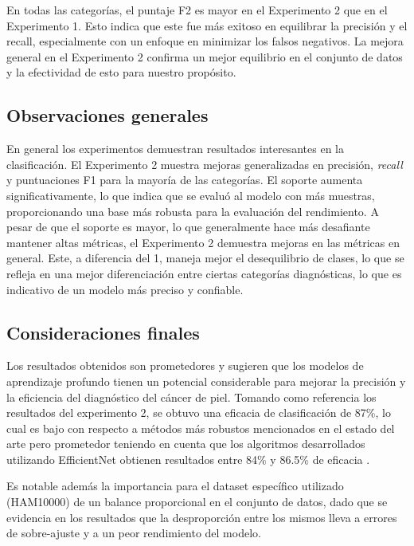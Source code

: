 En todas las categorías, el puntaje F2 es mayor en el Experimento 2 que en el Experimento 1. Esto indica que este fue más exitoso en equilibrar la precisión y el recall, especialmente con un enfoque en minimizar los falsos negativos. La mejora general en el Experimento 2 confirma un mejor equilibrio en el conjunto de datos y la efectividad de esto para nuestro propósito.

\subsection{Observaciones generales}

En general los experimentos demuestran resultados interesantes en la clasificación. El Experimento 2 muestra mejoras generalizadas en precisión, \textit{recall} y puntuaciones F1 para la mayoría de las categorías. El soporte aumenta significativamente, lo que indica que se evaluó al modelo con más muestras, proporcionando una base más robusta para la evaluación del rendimiento. A pesar de que el soporte es mayor, lo que generalmente hace más desafiante mantener altas métricas, el Experimento 2 demuestra mejoras en las métricas en general. Este, a diferencia del 1, maneja mejor el desequilibrio de clases, lo que se refleja en una mejor diferenciación entre ciertas categorías diagnósticas, lo que es indicativo de un modelo más preciso y confiable.

\subsection{Consideraciones finales}

Los resultados obtenidos son prometedores y sugieren que los modelos de aprendizaje profundo tienen un potencial considerable para mejorar la precisión y la eficiencia del diagnóstico del cáncer de piel. Tomando como referencia los resultados del experimento 2, se obtuvo una eficacia de clasificación de 87\%, lo cual es bajo con respecto a métodos más robustos mencionados en el estado del arte pero prometedor teniendo en cuenta que los algoritmos desarrollados utilizando EfficientNet obtienen resultados entre 84\% y 86.5\% de eficacia .

Es notable además la importancia para el dataset específico utilizado (HAM10000) de un balance proporcional en el conjunto de datos, dado que se evidencia en los resultados que la desproporción entre los mismos lleva a errores de sobre-ajuste y a un peor rendimiento del modelo.

